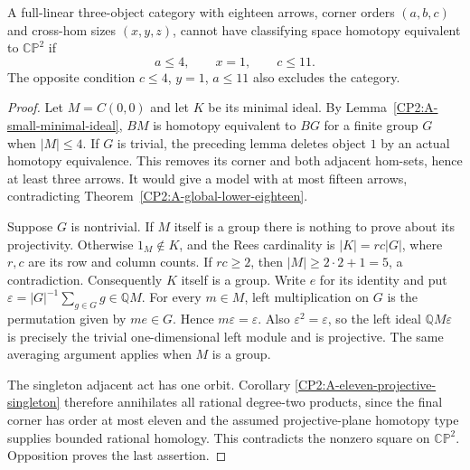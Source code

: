 \begin{corollary}
\label{CP2:A-eighteen-small-initial-singleton}
A full-linear three-object category with eighteen arrows,
corner orders $(a,b,c)$ and cross-hom sizes $(x,y,z)$, cannot
have classifying space homotopy equivalent to $\mathbb{CP}^2$
if
\[
 a\leq4,\qquad x=1,\qquad c\leq11.
\]
The opposite condition $c\leq4$, $y=1$, $a\leq11$ also
excludes the category.
\end{corollary}
\begin{proof}
Let $M=C(0,0)$ and let $K$ be its minimal ideal.  By
Lemma~\ref{CP2:A-small-minimal-ideal}, $BM$ is homotopy
equivalent to $BG$ for a finite group $G$ when $|M|\leq4$.
If $G$ is trivial, the preceding lemma deletes object $1$
by an actual homotopy equivalence.  This removes its corner
and both adjacent hom-sets, hence at least three arrows.
It would give a model with at most fifteen arrows,
contradicting Theorem~\ref{CP2:A-global-lower-eighteen}.

Suppose $G$ is nontrivial.  If $M$ itself is a group there
is nothing to prove about its projectivity.  Otherwise
$1_M\notin K$, and the Rees cardinality is
$|K|=rc|G|$, where $r,c$ are its row and column counts.
If $rc\geq2$, then $|M|\geq2\cdot2+1=5$, a contradiction.
Consequently $K$ itself is a group.  Write $e$ for its identity
and put $\varepsilon=|G|^{-1}\sum_{g\in G}g\in\mathbb QM$.
For every $m\in M$, left multiplication on $G$ is the
permutation given by $me\in G$.  Hence $m\varepsilon=\varepsilon$.
Also $\varepsilon^2=\varepsilon$, so the left ideal
$\mathbb QM\varepsilon$ is precisely the trivial
one-dimensional left module and is projective.  The same
averaging argument applies when $M$ is a group.

The singleton adjacent act has one orbit.  Corollary
\ref{CP2:A-eleven-projective-singleton} therefore annihilates
all rational degree-two products, since the final corner
has order at most eleven and the assumed projective-plane
homotopy type supplies bounded rational homology.  This
contradicts the nonzero square on $\mathbb{CP}^2$.
Opposition proves the last assertion.
\end{proof}
